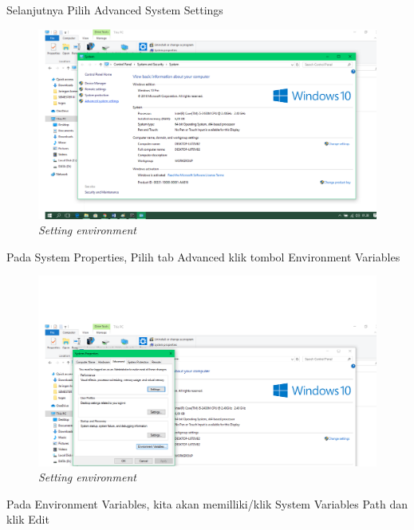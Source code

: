\par Selanjutnya Pilih Advanced System Settings

\begin{figure}[!htbp]
    \centering
    \includegraphics[scale=0.3]{gambar/cek ev1.png}
    \caption{\textit{Setting environment}}
    \label{Figure312}
\end{figure}

\par Pada System Properties, Pilih tab Advanced klik tombol Environment Variables

\begin{figure}[!htbp]
    \centering
    \includegraphics[scale=0.3]{gambar/cek ev2.png}
    \caption{\textit{Setting environment}}
    \label{Figure44412}
\end{figure}

\par Pada Environment Variables, kita akan memilliki/klik System Variables Path dan klik Edit 

